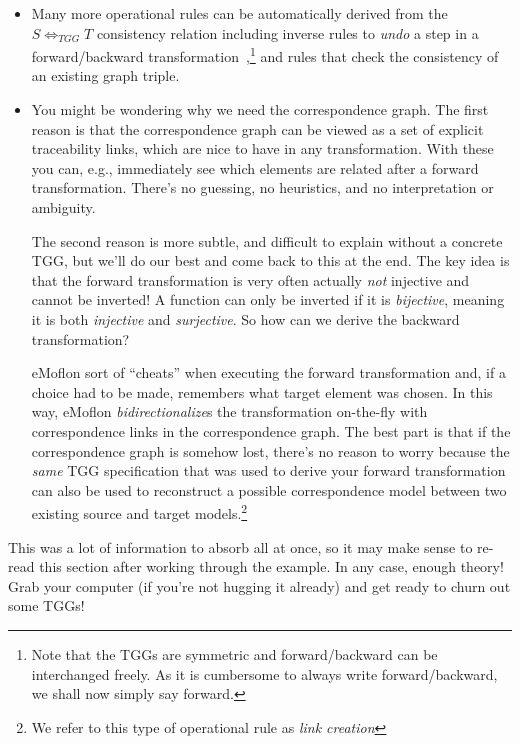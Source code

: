 \begin{itemize}

\item Many more operational rules can be automatically derived from the $S \Leftrightarrow_{TGG} T$ consistency relation including inverse rules to \emph{undo}
a step in a forward/backward transformation~\cite{LAVS_ICGT_2012},\footnote{Note that the TGGs are symmetric and forward/backward can be interchanged freely.
As it is cumbersome to always write forward/backward, we shall now simply say forward.} and rules that check the consistency of an existing graph triple.

\item You might be wondering why we need the correspondence graph. The first reason is that the correspondence graph can be viewed as a set of explicit
traceability links, which are nice to have in any transformation. With these you can, e.g., immediately see which elements are related after a forward
transformation. There's no guessing, no heuristics, and no interpretation or ambiguity.

\vspace{0.25cm}

The second reason is more subtle, and difficult to explain without a concrete TGG, but we'll do our best and come back to this at the end. The
key idea is that the forward transformation is very often actually \emph{not} injective and cannot be inverted! A function
can only be inverted if it is \emph{bijective}, meaning it is both \emph{injective} and \emph{surjective}. So how can we derive the backward
transformation?

\vspace{0.25cm}

eMoflon sort of ``cheats'' when executing the forward transformation and, if a choice had to be made, remembers what target element was chosen. In this way,
eMoflon \emph{bidirectionalize}s the transformation on-the-fly with correspondence links in the correspondence graph. The best part is that if the
correspondence graph is somehow lost, there's no reason to worry because the \emph{same} TGG specification that was used to derive your forward transformation
can also be used to reconstruct a possible correspondence model between two existing source and target models.\footnote{We refer to this type of operational
rule as \emph{link creation}}

\end{itemize}
This was a lot of information to absorb all at once, so it may make sense to re-read this section after working through the example. In any case, enough theory!
Grab your computer (if you're not hugging it already) and get ready to churn out some TGGs!
